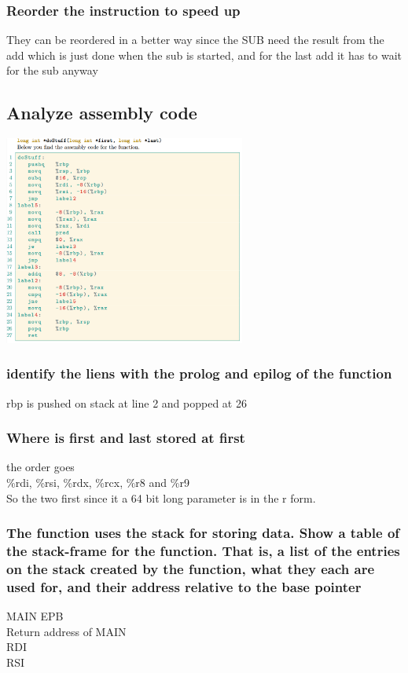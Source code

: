 \documentclass[12pt, a4paper]{article}
\begin{document}
			\subsubsection{Reorder the instruction to speed up}
				They can be reordered in a better way since the SUB need the result from the add which is just done when the sub is started, and for the last add it has to wait for the sub anyway
		\subsection{Analyze assembly code}
			\includegraphics[width=300px]{assets/assembly20185.png}
			\subsubsection{identify the liens with the prolog and epilog of the function}
				rbp is pushed on stack at line 2 and popped at 26
			\subsubsection{Where is first and last stored at first}
				the order goes\\
				\%rdi, \%rsi, \%rdx, \%rcx, \%r8 and \%r9\\
				So the two first since it a 64 bit long parameter is in the r form.
			\subsubsection{The function uses the stack for storing data. Show a table of the stack-frame for the function. That is, a list of the entries on the stack created by the function, what they each are used for, and their address relative to the base pointer}
				MAIN EPB\\
				Return address of MAIN\\
				RDI\\
				RSI\\
\end{document}
